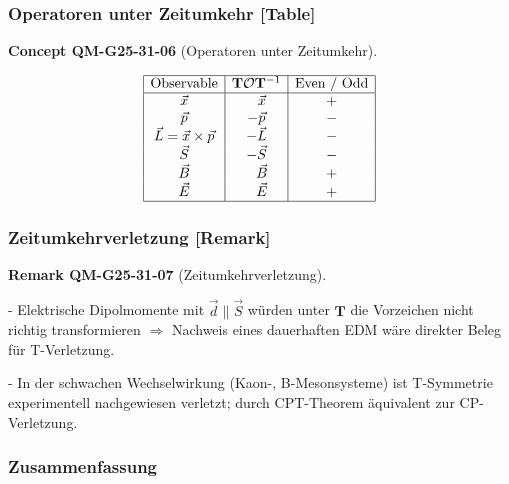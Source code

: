 \documentclass[10pt, letterpaper]{article}
\newcommand{\CustomHeading}[3]{%
  \par\medskip\noindent%
  \textbf{#1 #2} \textnormal{(#3)}.\enskip%
}
\newenvironment{REM}[2]{\begin{unitbox}\CustomHeading{Remark}{#1}{#2}}{\end{unitbox}}
\newenvironment{CONC}[2]{\begin{unitbox}\CustomHeading{Concept}{#1}{#2}}{\end{unitbox}}
\begin{document}

\subsubsection*{Operatoren unter Zeitumkehr [Table]}

\begin{CONC}{QM-G25-31-06}{Operatoren unter Zeitumkehr}
\[
\begin{array}{|c|c|c|}
  \hline
  \text{Observable} & \mathbf T\mathcal O\mathbf T^{-1}
                    & \text{Even / Odd} \\
  \hline
  \vec x    & \phantom{-}\vec x & + \\
  \vec p    &          -\vec p & - \\
  \vec L=\vec x\times\vec p & -\vec L & - \\
  \vec S    &          -\vec S & - \\
  \vec B    &          \phantom{-}\vec B & + \\
  \vec E    &          \phantom{-}\vec E & + \\
  \hline
\end{array}
\]
\end{CONC}


\subsubsection*{Zeitumkehrverletzung [Remark]}

\begin{REM}{QM-G25-31-07}{Zeitumkehrverletzung}
- Elektrische Dipolmomente mit
$\vec d\parallel\vec S$
würden unter $\mathbf T$ die Vorzeichen nicht richtig transformieren
$\Rightarrow$ Nachweis eines dauerhaften EDM wäre direkter Beleg
für T-Verletzung.

- In der schwachen Wechselwirkung (Kaon-, B-Mesonsysteme)
ist T-Symmetrie experimentell nachgewiesen verletzt;  
durch CPT-Theorem äquivalent zur CP-Verletzung.
\end{REM}


\subsubsection*{Zusammenfassung}
\end{document}
